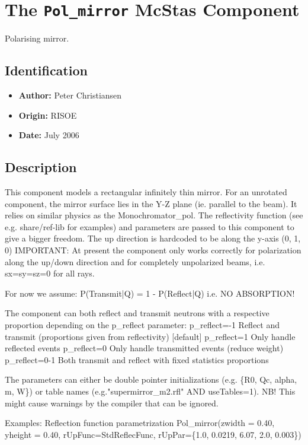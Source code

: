 \section{The \texttt{Pol\_mirror} McStas Component}
Polarising mirror.

\subsection*{Identification}
\begin{itemize}
  \item \textbf{Author:} Peter Christiansen
  \item \textbf{Origin:} RISOE
  \item \textbf{Date:} July 2006
\end{itemize}

\subsection*{Description}
This component models a rectangular infinitely thin mirror. For an unrotated component, the mirror surface lies in the Y-Z plane (ie. parallel to the beam). It relies on similar physics as the Monochromator\_pol. The reflectivity function (see e.g. share/ref-lib for examples) and parameters are passed to this component to give a bigger freedom. The up direction is hardcoded to be along the y-axis (0, 1, 0) IMPORTANT: At present the component only works correctly for polarization along the up/down direction and for completely unpolarized beams, i.e. sx=sy=sz=0 for all rays.

For now we assume: P(Transmit|Q) = 1 - P(Reflect|Q) i.e. NO ABSORPTION!

The component can both reflect and transmit neutrons with a respective proportion depending on the p\_reflect parameter: p\_reflect=-1 Reflect and transmit (proportions given from reflectivity) [default] p\_reflect=1 Only handle reflected events p\_reflect=0 Only handle transmitted events (reduce weight) p\_reflect=0-1 Both transmit and reflect with fixed statistics proportions

The parameters can either be double pointer initializations (e.g. \{R0, Qc, alpha, m, W\}) or table names (e.g."supermirror\_m2.rfl" AND useTables=1). NB! This might cause warnings by the compiler that can be ignored.

Examples: Reflection function parametrization Pol\_mirror(zwidth = 0.40, yheight = 0.40, rUpFunc=StdReflecFunc, rUpPar=\{1.0, 0.0219, 6.07, 2.0, 0.003\})

